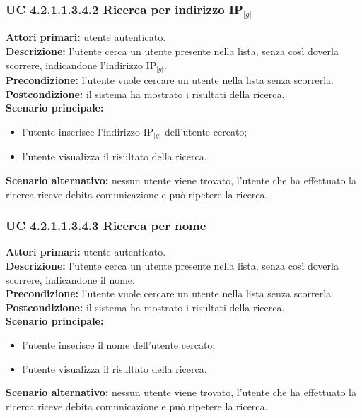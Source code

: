 \subsubsection{UC 4.2.1.1.3.4.2 Ricerca per indirizzo IP$_{|g|}$}
\noindent
\textbf{Attori primari:} utente autenticato.\\
\textbf{Descrizione:} l'utente cerca un utente presente nella lista, senza così doverla scorrere, indicandone l'indirizzo IP$_{|g|}$.\\
\textbf{Precondizione:} l'utente vuole cercare un utente nella lista senza scorrerla.\\
\textbf{Postcondizione:} il sistema ha mostrato i risultati della ricerca.\\
\textbf{Scenario principale:}
\begin{itemize}
\item l'utente inserisce l'indirizzo IP$_{|g|}$ dell'utente cercato;
\item l'utente visualizza il risultato della ricerca.
\end{itemize}
\textbf{Scenario alternativo:} nessun utente viene trovato, l'utente che ha effettuato la ricerca riceve debita comunicazione e può ripetere la ricerca.

\subsubsection{UC 4.2.1.1.3.4.3 Ricerca per nome}
\noindent
\textbf{Attori primari:} utente autenticato.\\
\textbf{Descrizione:} l'utente cerca un utente presente nella lista, senza così doverla scorrere, indicandone il nome.\\
\textbf{Precondizione:} l'utente vuole cercare un utente nella lista senza scorrerla.\\
\textbf{Postcondizione:} il sistema ha mostrato i risultati della ricerca.\\
\textbf{Scenario principale:}
\begin{itemize}
\item l'utente inserisce il nome dell'utente cercato;
\item l'utente visualizza il risultato della ricerca.
\end{itemize}
\textbf{Scenario alternativo:} nessun utente viene trovato, l'utente che ha effettuato la ricerca riceve debita comunicazione e può ripetere la ricerca.

